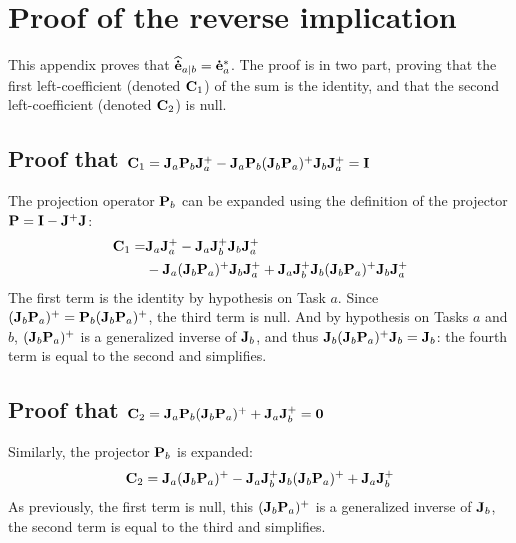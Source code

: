 \documentclass[journal]{IEEEtran}
\begin{document}
%
\FloatBarrier

\appendices
\section{Proof of the reverse implication}
\label{sec:appx}

This appendix proves that ${\mathbf{\widehat{\dot{e}}}}_{a|b} = {\mathbf{\dot{e}}}_{a}^*$. The proof is in two part, proving that the first left-coefficient (denoted ${\mathbf{C}}_1$) of the sum is the identity, and that the second left-coefficient (denoted ${\mathbf{C}}_2$) is null.

\subsection{Proof that ${\mathbf{C}}_1 = {\mathbf{J}}_{a} {\mathbf{P}}_{b} {\mathbf{J}}_{a}^+ - {\mathbf{J}}_{a} {\mathbf{P}}_{b} ({\mathbf{J}}_{b} {\mathbf{P}}_{a} )^+ {\mathbf{J}}_{b} {\mathbf{J}}_{a}^+ = {\mathbf{I}}$}
The projection operator ${\mathbf{P}}_{b}$ can be expanded using the definition of the projector ${\mathbf{P}} = {\mathbf{I}} - {\mathbf{J}}^+ {\mathbf{J}}$:
\begin{align*}
{\mathbf{C}}_1 =& {\mathbf{J}}_{a} {\mathbf{J}}_{a}^+ -   {\mathbf{J}}_{a} {\mathbf{J}}_{b}^+ {\mathbf{J}}_{b} {\mathbf{J}}_{a}^+ \\
&- {\mathbf{J}}_{a} ({\mathbf{J}}_{b} {\mathbf{P}}_{a} )^+ {\mathbf{J}}_{b} {\mathbf{J}}_{a}^+  + {\mathbf{J}}_{a} {\mathbf{J}}_{b}^+ {\mathbf{J}}_{b} ({\mathbf{J}}_{b} {\mathbf{P}}_{a} )^+ {\mathbf{J}}_{b} {\mathbf{J}}_{a}^+
\end{align*}
The first term is the identity by hypothesis on Task $a$. Since $({\mathbf{J}}_{b} {\mathbf{P}}_{a} )^+ = {\mathbf{P}}_{b}({\mathbf{J}}_{b} {\mathbf{P}}_{a} )^+$, the third term is null. And by hypothesis on Tasks $a$ and $b$, $({\mathbf{J}}_{b} {\mathbf{P}}_{a} )^+$ is a generalized inverse of ${\mathbf{J}}_{b}$, and thus ${\mathbf{J}}_{b} ({\mathbf{J}}_{b} {\mathbf{P}}_{a} )^+ {\mathbf{J}}_{b} = {\mathbf{J}}_{b}$: the fourth term is equal to the second and simplifies. \QED

\subsection{Proof that ${\mathbf{C}}_2 = {\mathbf{J}}_{a} {\mathbf{P}}_{b} ({\mathbf{J}}_{b} {\mathbf{P}}_{a} )^+ + {\mathbf{J}}_{a} {\mathbf{J}}_{b}^+ = {\mathbf{0}}$}
Similarly, the projector ${\mathbf{P}}_{b}$ is expanded:
\[
{\mathbf{C}}_2 = {\mathbf{J}}_{a} ({\mathbf{J}}_{b} {\mathbf{P}}_{a} )^+ - {\mathbf{J}}_{a} {\mathbf{J}}_{b}^+{\mathbf{J}}_{b} ({\mathbf{J}}_{b} {\mathbf{P}}_{a} )^+ + {\mathbf{J}}_{a} {\mathbf{J}}_{b}^+
\]
As previously, the first term is null, this $({\mathbf{J}}_{b} {\mathbf{P}}_{a} )^+$ is a generalized inverse of ${\mathbf{J}}_{b}$, the second term is equal to the third and simplifies. \QED
\end{document}

